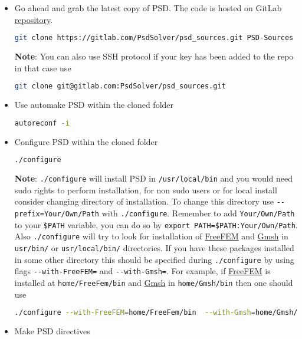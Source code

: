\begin{itemize}
\item
  Go ahead and grab the latest copy of PSD. The code is hosted on GitLab
  \href{https://gitlab.com/PsdSolver/psd_sources}{repository}.

\begin{lstlisting}[language=bash]
git clone https://gitlab.com/PsdSolver/psd_sources.git PSD-Sources
\end{lstlisting}

  \textbf{Note}: You can also use SSH protocol if your key has been
  added to the repo in that case use

\begin{lstlisting}[language=bash]
git clone git@gitlab.com:PsdSolver/psd_sources.git
\end{lstlisting}
\item
  Use automake PSD within the cloned folder

\begin{lstlisting}[language=bash]
autoreconf -i
\end{lstlisting}
\item
  Configure PSD within the cloned folder

\begin{lstlisting}[language=bash]
./configure 
\end{lstlisting}

  \textbf{Note}: \lstinline!./configure! will install PSD in
  \lstinline!/usr/local/bin! and you would need sudo rights to perform
  installation, for non sudo users or for local install consider
  changing directory of installation. To change this directory use
  \lstinline!--prefix=Your/Own/Path! with \lstinline!./configure!.
  Remember to add \lstinline!Your/Own/Path! to your \lstinline!$PATH!
  variable, you can do so by
  \lstinline!export PATH=$PATH:Your/Own/Path!. Also
  \lstinline!./configure! will try to look for installation of
  \href{https://freefem.org/}{FreeFEM} and
  \href{http://gmsh.info/}{Gmsh} in \lstinline!usr/bin/! or
  \lstinline!usr/local/bin/! directories. If you have these packages
  installed in some other directory this should be specified during
  \lstinline!./configure! by using flags \lstinline!--with-FreeFEM=! and
  \lstinline!--with-Gmsh=!. For example, if
  \href{https://freefem.org/}{FreeFEM} is installed at
  \lstinline!home/FreeFem/bin! and \href{http://gmsh.info/}{Gmsh} in
  \lstinline!home/Gmsh/bin! then one should use

\begin{lstlisting}[language=bash]
./configure --with-FreeFEM=home/FreeFem/bin  --with-Gmsh=home/Gmsh/bin
\end{lstlisting}
\item
  Make PSD directives


\end{itemize}
